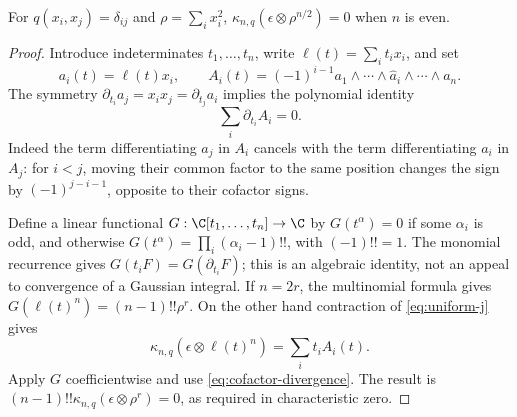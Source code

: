 \begin{lemma}
\label{lem:wick-cofactor}
For \(q(x_i,x_j)=\delta_{ij}\) and \(\rho=\sum_i x_i^2\),
\(\kappa_{n,q}(\epsilon\otimes\rho^{n/2})=0\) when \(n\) is even.
\end{lemma}
\begin{proof}
Introduce indeterminates \(t_1,\ldots,t_n\), write
\(\ell(t)=\sum_i t_i x_i\), and set
\[
 a_i(t)=\ell(t)x_i,\qquad
 A_i(t)=(-1)^{i-1}a_1\wedge\cdots\wedge\widehat a_i
                         \wedge\cdots\wedge a_n.
\]
The symmetry \(\partial_{t_i}a_j=x_ix_j=\partial_{t_j}a_i\)
implies the polynomial identity
\begin{equation}\label{eq:cofactor-divergence}
 \sum_i\partial_{t_i}A_i=0.
\end{equation}
Indeed the term differentiating \(a_j\) in \(A_i\) cancels
with the term differentiating \(a_i\) in \(A_j\): for \(i<j\),
moving their common factor to the same position changes the sign
by \((-1)^{j-i-1}\), opposite to their cofactor signs.

Define a linear functional \(G:\C[t_1,\ldots,t_n]\to\C\) by
\(G(t^\alpha)=0\) if some \(\alpha_i\) is odd, and otherwise
\(G(t^\alpha)=\prod_i(\alpha_i-1)!!\), with \((-1)!!=1\).
The monomial recurrence gives
\(G(t_iF)=G(\partial_{t_i}F)\); this is an algebraic identity,
not an appeal to convergence of a Gaussian integral.  If \(n=2r\),
the multinomial formula gives
\(G(\ell(t)^n)=(n-1)!!\rho^r\).
On the other hand contraction of \eqref{eq:uniform-j} gives
\[
 \kappa_{n,q}(\epsilon\otimes\ell(t)^n)=\sum_i t_i A_i(t).
\]
Apply \(G\) coefficientwise and use \eqref{eq:cofactor-divergence}.
The result is \((n-1)!!\kappa_{n,q}(\epsilon\otimes\rho^r)=0\),
as required in characteristic zero.
\end{proof}

